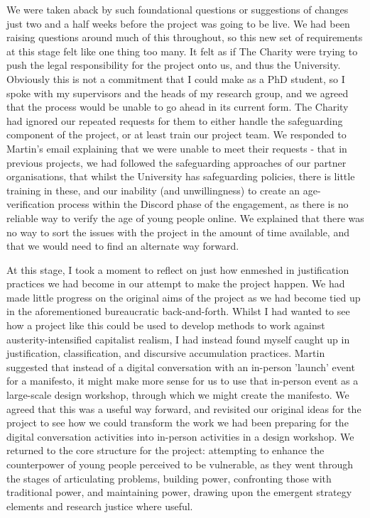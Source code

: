 We were taken aback by such foundational questions or suggestions of changes just two and a half weeks before the project was going to be live. We had been raising questions around much of this throughout, so this new set of requirements at this stage felt like one thing too many. It felt as if The Charity were trying to push the legal responsibility for the project onto us, and thus the University. Obviously this is not a commitment that I could make as a PhD student, so I spoke with my supervisors and the heads of my research group, and we agreed that the process would be unable to go ahead in its current form. The Charity had ignored our repeated requests for them to either handle the safeguarding component of the project, or at least train our project team. We responded to Martin's email explaining that we were unable to meet their requests - that in previous projects, we had followed the safeguarding approaches of our partner organisations, that whilst the University has safeguarding policies, there is little training in these, and our inability (and unwillingness) to create an age-verification process within the Discord phase of the engagement, as there is no reliable way to verify the age of young people online. We explained that there was no way to sort the issues with the project in the amount of time available, and that we would need to find an alternate way forward. 

At this stage, I took a moment to reflect on just how enmeshed in justification practices we had become in our attempt to make the project happen. We had made little progress on the original aims of the project as we had become tied up in the aforementioned bureaucratic back-and-forth. Whilst I had wanted to see how a project like this could be used to develop methods to work against austerity-intensified capitalist realism, I had instead found myself caught up in justification, classification, and discursive accumulation practices. Martin suggested that instead of a digital conversation with an in-person 'launch' event for a manifesto, it might make more sense for us to use that in-person event as a large-scale design workshop, through which we might create the manifesto. We agreed that this was a useful way forward, and revisited our original ideas for the project to see how we could transform the work we had been preparing for the digital conversation activities into in-person activities in a design workshop. We returned to the core structure for the project: attempting to enhance the counterpower of young people perceived to be vulnerable, as they went through the stages of articulating problems, building power, confronting those with traditional power, and maintaining power, drawing upon the emergent strategy elements and research justice where useful. 

